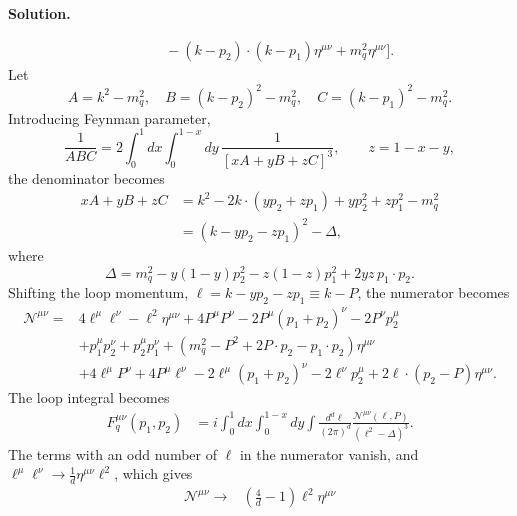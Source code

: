\documentclass[a4paper,11pt]{article}
\newenvironment{solution}{\par\medskip\noindent\textbf{Solution.}\par\smallskip}{\par\medskip}
\begin{document}
\begin{solution}
\begin{equation}
\begin{aligned}
&\qquad
-(k-p_2)\cdot(k-p_1)\eta^{\mu\nu}
+m_q^2\eta^{\mu\nu}
\Big].
\end{aligned}
\end{equation}
Let
\begin{equation}
    A=k^2-m_q^2,\quad B=(k-p_2)^2-m_q^2,\quad C=(k-p_1)^2-m_q^2.
\end{equation}
Introducing Feynman parameter,
\begin{equation}
    \frac{1}{ABC}
    =
    2\int_0^1dx\int_0^{1-x}dy\,
    \frac{1}{[xA+yB+zC]^3},
    \qquad z=1-x-y,
\end{equation}
the denominator becomes
\begin{equation}
\begin{aligned}
xA+yB+zC
&=
k^2-2k\cdot(yp_2+zp_1)
+yp_2^2+zp_1^2-m_q^2
\\
&=
(k-yp_2-zp_1)^2-\Delta,
\end{aligned}
\end{equation}
where
\begin{equation}
    \Delta
    =
    m_q^2-y(1-y)p_2^2-z(1-z)p_1^2
    +2yz\,p_1\cdot p_2.
\end{equation}
Shifting the loop momentum, $\ell = k - yp_2-zp_1\equiv k - P$, the numerator becomes
\begin{equation}
\begin{aligned}
\mathcal N^{\mu\nu}
={}&
4\ell^\mu\ell^\nu-\ell^2\eta^{\mu\nu}
+4P^\mu P^\nu
-2P^\mu(p_1+p_2)^\nu
-2P^\nu p_2^\mu
\\
&+p_1^\mu p_2^\nu+p_2^\mu p_1^\nu
+\left(
m_q^2-P^2+2P\cdot p_2-p_1\cdot p_2
\right)\eta^{\mu\nu}
\\
&+4\ell^\mu P^\nu+4P^\mu\ell^\nu
-2\ell^\mu(p_1+p_2)^\nu
-2\ell^\nu p_2^\mu
+2\ell\cdot(p_2-P)\eta^{\mu\nu}.
\end{aligned}
\end{equation}
The loop integral becomes
\begin{equation}
\begin{aligned}
F^{\mu\nu}_q(p_1,p_2)
&=
i\int_0^1dx\int_0^{1-x}dy
\int\frac{d^d\ell}{(2\pi)^d}
\frac{\mathcal N^{\mu\nu}(\ell,P)}
     {(\ell^2-\Delta)^3}.
\end{aligned}
\end{equation}
The terms with an odd number of $\ell$ in the numerator vanish, and $\ell^\mu \ell^\nu \to \frac{1}{d}\eta^{\mu\nu}\ell^2$, which gives
\begin{equation}
\begin{aligned}
\mathcal N^{\mu\nu}
\longrightarrow{}&
\left(\frac{4}{d}-1\right)\ell^2\eta^{\mu\nu}

\end{aligned}
\end{equation}
\end{solution}
\end{document}
